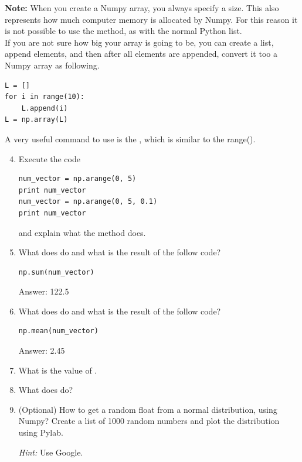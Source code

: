 \documentclass{article}
\begin{document}
{\bf Note:}
When you create a Numpy array, you always specify a size.
This also represents how much computer memory is allocated by Numpy.
For this reason it is not possible to use the  method, as with
the normal Python list.\\

If you are not sure how big your array is going to be, you can create a list, append elements,
and then after all elements are appended, convert it too a Numpy array as following.

\begin{lstlisting}
L = []
for i in range(10):
    L.append(i)
L = np.array(L)
\end{lstlisting}

A very useful command to use is the , which is similar to the range().

\begin{enumerate}
    \setcounter{enumi}{3}
    \item Execute the code

\begin{lstlisting}
num_vector = np.arange(0, 5)
print num_vector
num_vector = np.arange(0, 5, 0.1)
print num_vector
\end{lstlisting}

    and explain what the method  does.


    \item What does  do and what is the result of the follow code?

\begin{lstlisting}
np.sum(num_vector)
\end{lstlisting}

    Answer: 122.5

    \item What does  do and what is the result of the follow code?

\begin{lstlisting}
np.mean(num_vector)
\end{lstlisting}

    Answer: 2.45

    \item What is the value of .

    \item What does  do?

    \item (Optional) How to get a random float from a normal distribution,
        using Numpy? Create a list of 1000 random numbers and plot the
        distribution using Pylab.

        {\em Hint:} Use Google.

\end{enumerate}
\end{document}
